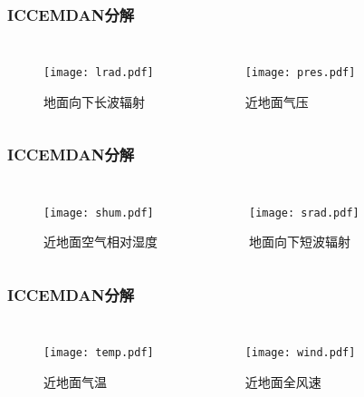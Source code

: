 \documentclass[14pt, AutoFakeBold]{ppt}
\begin{document}
\begin{frame}
  \frametitle{ICCEMDAN分解}
  \begin{columns}
    \begin{figure}[H]
      \centering
      \texttt{[image: lrad.pdf]}
      \caption{地面向下长波辐射}
      \label{fig_iccemdan_lrad}
    \end{figure}
    \begin{figure}[H]
      \centering
      \texttt{[image: pres.pdf]}
      \caption{近地面气压}
      \label{fig_iccemdan_pres}
    \end{figure}
  \end{columns}
\end{frame}

\begin{frame}
  \frametitle{ICCEMDAN分解}
  \begin{columns}
    \begin{figure}[H]
      \centering
      \texttt{[image: shum.pdf]}
      \caption{近地面空气相对湿度}
      \label{fig_iccemdan_shum}
    \end{figure}
    \begin{figure}[H]
      \centering
      \texttt{[image: srad.pdf]}
      \caption{地面向下短波辐射}
      \label{fig_iccemdan_srad}
    \end{figure}
  \end{columns}
\end{frame}

\begin{frame}
  \frametitle{ICCEMDAN分解}
  \begin{columns}
    \begin{figure}[H]
      \centering
      \texttt{[image: temp.pdf]}
      \caption{近地面气温}
      \label{fig_iccemdan_temp}
    \end{figure}
    \begin{figure}[H]
      \centering
      \texttt{[image: wind.pdf]}
      \caption{近地面全风速}
      \label{fig_iccemdan_wind}
    \end{figure}
  \end{columns}
\end{frame}
\end{document}

